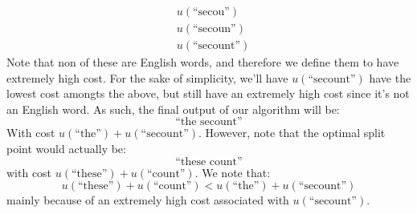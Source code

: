 \documentclass[12pt]{article}
\begin{document}
\begin{enumerate}
\begin{align*}
  &u(\text{``secou''}) \\
  &u(\text{``secoun''}) \\
  &u(\text{``secount''})
\end{align*}
Note that non of these are English words, and therefore we define them to have extremely high cost. For the sake of simplicity, we'll have $u(\text{``secount''})$ have the lowest cost amongts the above, but still have an extremely high cost since it's not an English word. As such, the final output of our algorithm will be:
$$
  \text{``the secount''}
$$
With cost $u(\text{``the''}) + u(\text{``secount''})$. However, note that the optimal split point would actually be:
$$
  \text{``these count''}
$$
with cost $u(\text{``these''}) + u(\text{``count''})$. We note that: 
$$
  u(\text{``these''}) + u(\text{``count''}) < u(\text{``the''}) + u(\text{``secount''})
$$
mainly because of an extremely high cost associated with $u(\text{``secount''})$.
\end{enumerate}
\end{document}
